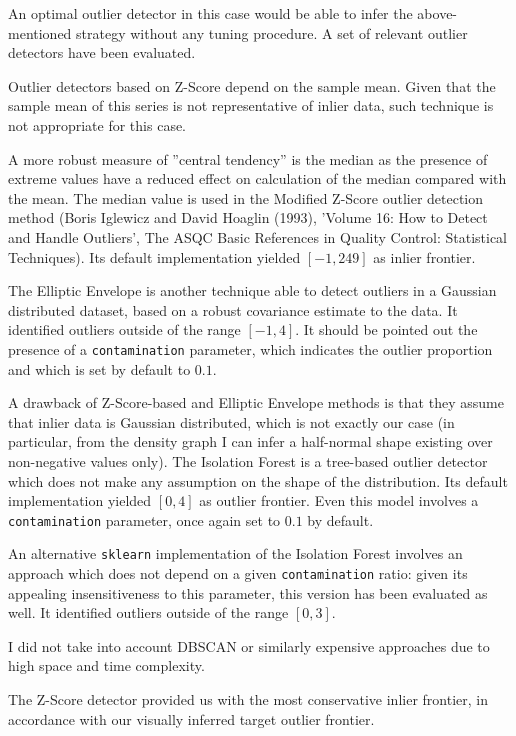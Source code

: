 \documentclass[preprint,12pt,3p]{elsarticle}
\begin{document}
An optimal outlier detector in this case would be able to infer the above-mentioned strategy without any tuning procedure. A set of relevant outlier detectors have been evaluated.

Outlier detectors based on Z-Score depend on the sample mean. Given that the sample mean of this series is not representative of inlier data, such technique is not appropriate for this case.

A more robust measure of ''central tendency'' is the median as the presence of extreme values have a reduced effect on calculation of the median compared with the mean. The median value is used in the Modified Z-Score outlier detection method (Boris Iglewicz and David Hoaglin (1993), 'Volume 16: How to Detect and Handle Outliers', The ASQC Basic References in Quality Control: Statistical Techniques). Its default implementation yielded $[-1,249]$ as inlier frontier. 

The Elliptic Envelope is another technique able to detect outliers in a Gaussian distributed dataset, based on a robust covariance estimate to the data. It identified outliers outside of the range $[-1,4]$. It should be pointed out the presence of a \verb|contamination| parameter, which indicates the outlier proportion and which is set by default to $0.1$.

A drawback of Z-Score-based and Elliptic Envelope methods is that they assume that inlier data is Gaussian distributed, which is not exactly our case (in particular, from the density graph I can infer a half-normal shape existing over non-negative values only).
The Isolation Forest is a tree-based outlier detector which does not make any assumption on the shape of the distribution. Its default implementation yielded $[0,4]$ as outlier frontier. Even this model involves a \verb|contamination| parameter, once again set to $0.1$ by default.

An alternative \verb|sklearn| implementation of the Isolation Forest involves an approach which does not depend on a given \verb|contamination| ratio: given its appealing insensitiveness to this parameter, this version has been evaluated as well. It identified outliers outside of the range $[0,3]$.

I did not take into account DBSCAN or similarly expensive approaches due to high space and time complexity.

The Z-Score detector provided us with the most conservative inlier frontier, in accordance with our visually inferred target outlier frontier.
\end{document}
